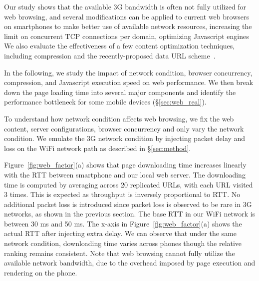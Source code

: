 \iffalse
In previous sections, we already described the experimental
methodology (\S\ref{sec:method_web}) and the setup
(\S\ref{sec:web_setup}). The overall idea behind all
our experiments is trying to understand the impact
of each factor on web performance, so we change
one variable at a time while fixing all other variables.
\fi

Our study shows that the available 3G bandwidth is often not fully
utilized for web browsing, and several modifications can be applied 
to current web browsers on smartphones to make better use of
available network resources, \eg increasing the limit on concurrent
TCP connections per domain, optimizing Javascript engines \etc We 
also evaluate the effectiveness of a few content optimization 
techniques, including compression and the recently-proposed data 
URL scheme~\cite{rfc2397}.

In the following, we study the impact of network condition, browser
concurrency, compression, and Javascript execution speed on web 
performance. We then break down the page loading time into several 
major components and identify the performance bottleneck for some 
mobile devices (\S\ref{sec:web_real}).

\label{sec:web_net}

To understand how network condition affects web browsing, we fix the 
web content, server configurations, browser concurrency and only vary 
the network condition. We emulate the 3G network condition by 
injecting packet delay and loss on the WiFi network path as described 
in \S\ref{sec:method}.

Figure~\ref{fig:web_factor}(a) shows that page downloading time increases
linearly with the RTT between smartphone and our local web server. 
The downloading time is computed by averaging across 20 replicated 
URLs, with each URL visited 3 times. This is expected as throughput 
is inversely proportional to RTT. No additional packet loss is 
introduced since packet loss is observed to be rare in 3G 
networks, as shown in the previous section. The base RTT in our WiFi network is between 30 ms and 50 ms. 
The x-axis in Figure~\ref{fig:web_factor}(a) shows the actual RTT 
after injecting extra delay. We can observe that under the same 
network condition, downloading time varies across phones though the 
relative ranking remains consistent. Note that web browsing cannot 
fully utilize the available network bandwidth, due to the overhead
imposed by page execution 
and rendering on the phone.

